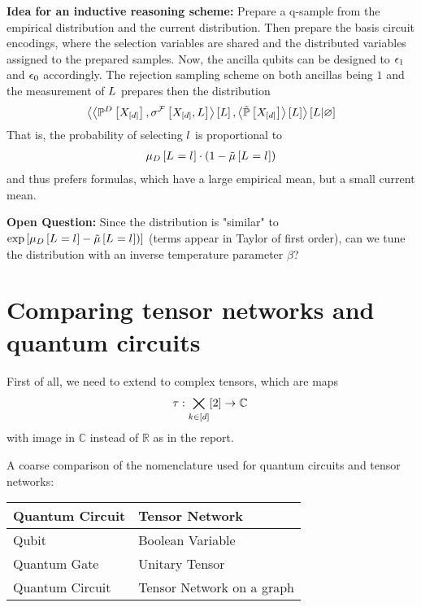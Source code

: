 \documentclass[aps,onecolumn,nofootinbib,pra]{article}
\begin{document}
    \textbf{Idea for an inductive reasoning scheme:} Prepare a q-sample from the empirical distribution and the current distribution.
    Then prepare the basis circuit encodings, where the selection variables are shared and the distributed variables assigned to the prepared samples.
    Now, the ancilla qubits can be designed to $\epsilon_{1}$ and $\epsilon_{0}$ accordingly.
    The rejection sampling scheme on both ancillas being $1$ and the measurement of $L$ prepares then the distribution
    \begin{align*}
        \left\langle 
            \left\langle \mathbb{P}^{D}\left[X_{[d]}\right], \sigma^{\mathcal{F}}\left[X_{[d]},L\right]\right\rangle \left[ L \right], \left\langle \tilde{\mathbb{P}}\left[X_{[d]}\right]\right\rangle \left[ L \right]
        \right\rangle \left[ L | \varnothing \right]
    \end{align*}
    That is, the probability of selecting $l$ is proportional to
    \begin{align*}
        \mu_{D}\left[L_{}=l_{}\right] \cdot (1-\tilde{\mu}\left[L_{}=l_{}\right])
    \end{align*}
    and thus prefers formulas, which have a large empirical mean, but a small current mean.

    \textbf{Open Question:} Since the distribution is "similar" to $\mathrm{exp}\left[\mu_{D}\left[L_{}=l_{}\right]-\tilde{\mu}\left[L_{}=l_{}\right])\right]$ (terms appear in Taylor of first order), can we tune the distribution with an inverse temperature parameter $\beta$?


    \section{Comparing tensor networks and quantum circuits}

    First of all, we need to extend to complex tensors, which are maps
    \begin{align*}
        \tau : \bigtimes_{k\in[d]}[2] \rightarrow \mathbb{C} \,
    \end{align*}
    with image in $\mathbb{C}$ instead of $\mathbb{R}$ as in the report.

    A coarse comparison of the nomenclature used for quantum circuits and tensor networks:

    \begin{center}
        \begin{tabular}{l|l}
            \textbf{Quantum Circuit} & \textbf{Tensor Network}   \\
            \hline
            Qubit                    & Boolean Variable          \\
            Quantum Gate             & Unitary Tensor            \\
            Quantum Circuit          & Tensor Network on a graph
        \end{tabular}
    \end{center}
\end{document}
